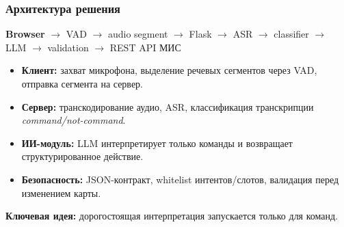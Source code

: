 \documentclass{beamer}
\begin{document}
\begin{frame}
  \frametitle{Архитектура решения}

  \begin{center}
    \small
    \textbf{Browser}
    $\rightarrow$ VAD
    $\rightarrow$ audio segment
    $\rightarrow$ Flask
    $\rightarrow$ ASR
    $\rightarrow$ classifier
    $\rightarrow$ LLM
    $\rightarrow$ validation
    $\rightarrow$ REST API МИС
  \end{center}

  \vspace{8pt}

  \begin{itemize}
    \item \textbf{Клиент:} захват микрофона, выделение речевых сегментов через VAD, отправка сегмента на сервер.
    \item \textbf{Сервер:} транскодирование аудио, ASR, классификация транскрипции \textit{command/not-command}.
    \item \textbf{ИИ-модуль:} LLM интерпретирует только команды и возвращает структурированное действие.
    \item \textbf{Безопасность:} JSON-контракт, whitelist интентов/слотов, валидация перед изменением карты.
  \end{itemize}

  \vspace{6pt}
  \textbf{Ключевая идея:} дорогостоящая интерпретация запускается только для команд.

\end{frame}
\end{document}
